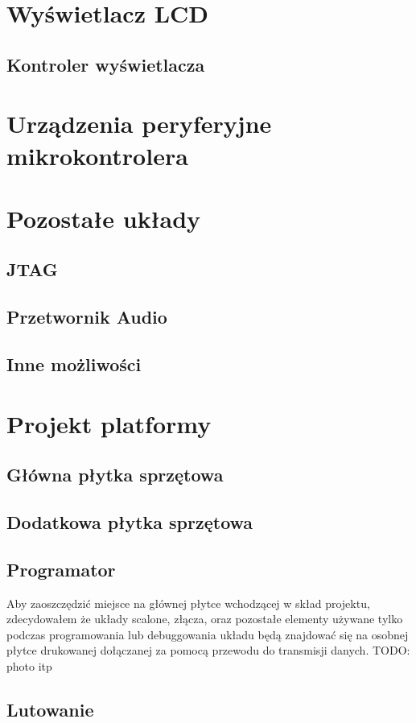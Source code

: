 \documentclass[a4paper,12pt]{book}
\begin{document}
		\section{Wyświetlacz LCD}
			\subsection{Kontroler wyświetlacza}
		\section{Urządzenia peryferyjne mikrokontrolera}
		\section{Pozostałe układy}
			\subsection{JTAG}
				\label{sec:jtag}
			\subsection{Przetwornik Audio}
			\subsection{Inne możliwości}
		\section{Projekt platformy}
			\label{sec:projekt_platformy}
			\subsection{Główna płytka sprzętowa}
			\subsection{Dodatkowa płytka sprzętowa}
			\subsection{Programator}
				\label{sec:programator}
				Aby zaoszczędzić miejsce na głównej płytce wchodzącej w skład projektu, zdecydowałem że układy scalone, złącza, oraz pozostałe elementy używane tylko podczas programowania lub debuggowania układu będą znajdować się na osobnej płytce drukowanej dołączanej za pomocą przewodu do transmisji danych. TODO: photo itp
			\subsection{Lutowanie}
\end{document}
